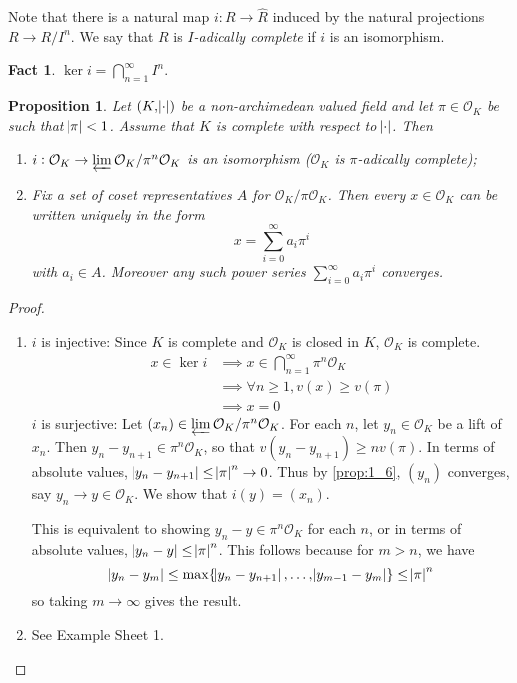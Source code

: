 \documentclass[11pt]{article}
\theoremstyle{definition}
\newtheorem*{fact}{Fact}
\theoremstyle{plain}
\newtheorem{proposition}[definition]{Proposition}
\theoremstyle{remark}
\newcommand{\cO}{\mathcal{O}}
\begin{document}
Note that there is a natural map $i : R \to \widehat{R}$ induced by the natural projections $R \to R/I^n$. We say that $R$ is \emph{$I$-adically complete} if $i$ is an isomorphism.

\begin{fact}
    $\ker{i} = \bigcap_{n=1}^\infty I^n$.
\end{fact}

\begin{proposition}\label{prop:3_5}
    Let $(K, \abs{\cdot})$ be a non-archimedean valued field and let $\pi \in \cO_K$ be such that $\abs{\pi} < 1$. Assume that $K$ is complete with respect to $\abs{\cdot}$. Then
    \begin{enumerate}
        \item $i : \cO_K \to \varprojlim \cO_K / \pi^n \cO_K$ is an isomorphism ($\cO_K$ is $\pi$-adically complete);
        \item Fix a set of coset representatives $A$ for $\cO_K / \pi \cO_K$. Then every $x \in \cO_K$ can be written uniquely in the form
            \begin{equation*}
                x = \sum_{i=0}^\infty a_i \pi^i
            \end{equation*}
            with $a_i \in A$.
            Moreover any such power series $\sum_{i=0}^\infty a_i \pi^i$ converges.
    \end{enumerate}
\end{proposition}
\begin{proof}\phantom{}
    \begin{enumerate}
        \item $i$ is injective: Since $K$ is complete and $\cO_K$ is closed in $K$, $\cO_K$ is complete.
            \begin{align*}
                x \in \ker i
                &\implies x \in \bigcap_{n=1}^\infty \pi^n \cO_K\\
                &\implies \forall n \ge 1, v(x) \ge v(\pi)\\
                &\implies x = 0
            \end{align*}
            $i$ is surjective: Let $(x_n) \in \varprojlim \cO_K / \pi^n \cO_K$. For each $n$, let $y_n \in \cO_K$ be a lift of $x_n$. Then $y_n - y_{n+1} \in \pi^n \cO_K$, so that $v(y_n - y_{n+1}) \ge n v(\pi)$. In terms of absolute values, $\abs{y_n - y_{n+1}} \le \abs{\pi}^n \to 0$. Thus by \autoref{prop:1_6}, $(y_n)$ converges, say $y_n \to y \in \cO_K$. We show that $i(y) = (x_n)$.

            This is equivalent to showing $y_n - y \in \pi^n \cO_K$ for each $n$, or in terms of absolute values, $\abs{y_n - y} \le \abs{\pi}^n$. This follows because for $m > n$, we have
            \begin{equation*}
                \abs{y_n - y_m} \le \max\{\abs{y_n - y_{n+1}}, \ldots, \abs{y_{m-1} - y_m} \} \le \abs{\pi}^n
            \end{equation*}
            so taking $m \to \infty$ gives the result.

        \item See Example Sheet 1. \qedhere
    \end{enumerate}
\end{proof}
\end{document}
